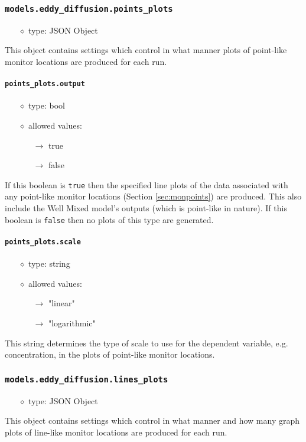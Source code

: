\documentclass[]{article}
\def\code#1{\texttt{#1}}
\begin{document}
\subsubsection{\code{models.eddy\_diffusion.points\_plots}}
\begin{itemize}
    \item[$\diamond$] type: JSON Object 
\end{itemize}
This object contains settings which control in what manner plots of point-like
monitor locations are produced for each run. 

\paragraph{\code{points\_plots.output}}
\begin{itemize}
    \item[$\diamond$] type: bool 
    \item[$\diamond$] allowed values:
    \begin{itemize}
        \item[$\rightarrow$] true
        \item[$\rightarrow$] false
    \end{itemize}
\end{itemize}
If this boolean is \code{true} then the specified line plots of the data
associated with any point-like monitor locations (Section \ref{sec:monpoints})
are produced. This also include the Well Mixed model's outputs (which is
point-like in nature). If this boolean is \code{false} then no plots of this
type are generated.

\paragraph{\code{points\_plots.scale}}
\begin{itemize}
    \item[$\diamond$] type: string 
    \item[$\diamond$] allowed values:
    \begin{itemize}
        \item[$\rightarrow$] "linear"
        \item[$\rightarrow$] "logarithmic"
    \end{itemize}
\end{itemize}
This string determines the type of scale to use for the dependent variable, e.g.
concentration, in the plots of point-like monitor locations.


\subsubsection{\code{models.eddy\_diffusion.lines\_plots}}
\begin{itemize}
    \item[$\diamond$] type: JSON Object 
\end{itemize}
This object contains settings which control in what manner and how many graph
plots of line-like monitor locations are produced for each run. 
\end{document}
